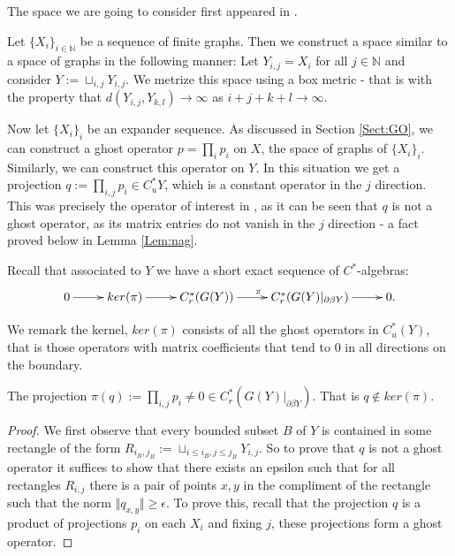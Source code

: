 \begin{example}
The space we are going to consider first appeared in \cite{MR2363697}.

Let $\lbrace X_{i} \rbrace_{i \in \mathbb{N}}$ be a sequence of finite graphs. Then we construct a space similar to a space of graphs in the following manner: Let $Y_{i,j} = X_{i}$ for all $j \in \mathbb{N}$ and consider $Y:= \sqcup_{i,j} Y_{i,j}$. We metrize this space using a box metric - that is with the property that $d(Y_{i,j},Y_{k,l}) \rightarrow \infty$ as $i+j+k+l \rightarrow \infty$. 

Now let $\lbrace X_{i} \rbrace_{i}$ be an expander sequence. As discussed in Section \ref{Sect:GO}, we can construct a ghost operator $p= \prod_{i} p_{i}$ on $X$, the space of graphs of $\lbrace X_{i} \rbrace_{i}$. Similarly, we can construct this operator on $Y$. In this situation we get a projection $q:=\prod_{i,j}p_{i} \in C^{*}_{u}Y$, which is a constant operator in the $j$ direction. This was precisely the operator of interest in \cite{MR2363697}, as it can be seen that $q$ is not a ghost operator, as its matrix entries do not vanish in the $j$ direction - a fact proved below in Lemma \ref{Lem:nag}.

Recall that associated to $Y$ we have a short exact sequence of $C^{*}$-algebras:
\begin{equation*}
\xymatrix{
0 \ar[r] & ker(\pi) \ar[r]& C_{r}^{*}(G(Y)) \ar[r]^{\pi} & C_{r}^{*}(G(Y)|_{\partial\beta Y}) \ar[r] & 0.
}
\end{equation*}

We remark the kernel, $ker(\pi)$ consists of all the ghost operators in $C^{*}_{u}(Y)$, that is those operators with matrix coefficients that tend to $0$ in all directions on the boundary. 

\begin{lemma}\label{Lem:nag}
The projection $\pi(q):= \prod_{i,j}p_{i} \not = 0 \in C^{*}_{r}(G(Y)|_{\partial\beta Y})$. That is $q \not\in ker(\pi)$.
\end{lemma}
\begin{proof}
We first observe that every bounded subset $B$ of $Y$ is contained in some rectangle of the form $R_{i_{B},j_{B}}:=\sqcup_{i\leq i_{B},j\leq j_{B}}Y_{i,j}$. So to prove that $q$ is not a ghost operator it suffices to show that there exists an epsilon such that for all rectangles $R_{i,j}$ there is a pair of points $x,y$ in the compliment of the rectangle such that  the norm $\Vert q_{x,y} \Vert \geq \epsilon$. To prove this, recall that the projection $q$ is a product of projections $p_{i}$ on each $X_{i}$ and fixing $j$, these projections form a ghost operator. 


\end{proof}
\end{example}
